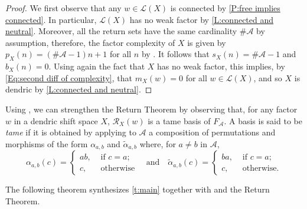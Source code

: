 \documentclass{amsart}
\newcommand*{\ret}{\mathcal{R}}
\newcommand*{\lang}{\mathcal{L}}
\newcommand*{\cA}{\mathcal{A}}
\newcommand*{\card}{\#}
\theoremstyle{plain}
\theoremstyle{definition}
\theoremstyle{remark}
\begin{document}
\begin{proof}
    We first observe that any $w \in \lang(X)$ is connected by \cref{P:free implies connected}. In particular, $\lang(X)$ has no weak factor by \cref{L:connected and neutral}. Moreover, all the return sets have the same cardinality $\card\cA$ by assumption, therefore, the factor complexity of $X$ is given by $p_X(n) = (\card\cA - 1)n + 1$ for all $n$ by \cite[Theorem~4.5]{Balkova2008}. It follows that $s_X(n) = \#\cA-1$ and $b_X(n) = 0$. Using again the fact that $X$ has no weak factor, this implies, by \cref{Eq:second diff of complexity}, that $m_X(w) = 0$ for all $w \in \lang(X)$, and so $X$ is dendric by \cref{L:connected and neutral}.
\end{proof}

Using \cite[Theorem~5.19]{Berthe2015a}, we can strengthen the Return Theorem by observing that, for any factor $w$ in a dendric shift space $X$, $\ret_X(w)$ is a tame basis of $F_\cA$. A basis is said to be {\em tame} if it is obtained by applying to $\cA$ a composition of permutations and morphisms of the form $\alpha_{a,b}$ and $\tilde{\alpha}_{a,b}$ where, for $a \ne b$ in $\cA$,
\[
    \alpha_{a,b}(c) =
    \begin{cases}
        ab, & \text{ if  $c=a$;} \\
        c, & \text{ otherwise}
    \end{cases}
    \quad
    \text{and}
    \quad
    \tilde{\alpha}_{a,b}(c) =
    \begin{cases}
        ba, & \text{ if $c=a$;} \\
        c, & \text{ otherwise.}
    \end{cases}
\]

The following theorem synthesizes \cref{t:main} together with \cite[Theorem~5.19]{Berthe2015a} and the Return Theorem.

\characThm*



\end{document}
